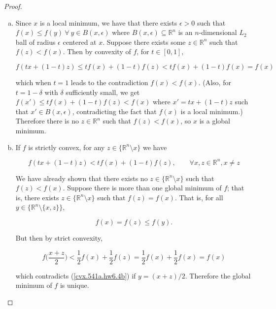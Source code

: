 \begin{proof}

\begin{enumerate}[(a)]

\item Since \(x\) is a local minimum, we have that there exists \(\epsilon > 0\) such that \(f(x) \leq f(y)  \ \forall \ y \in B(x, \epsilon)\) where \(B(x, \epsilon) \subseteq \mathbb{R}^n\) is an \(n\)-dimensional \(L_2\) ball of radius \(\epsilon\) centered at \(x\). Suppose there exists some \(z \in \mathbb{R}^n\) such that \(f(z) < f(x)\). Then by convexity of \(f\), for \(t \in [0, 1]\),

\[
f(tx + (1-t)z) \leq t f(x) + (1-t) f(z) <  t f(x) + (1-t) f(x) = f(x)
\]

which when \(t=1\) leads to the contradiction \(f(x) < f(x)\). (Also, for \(t = 1 -\delta\) with \(\delta\) sufficiently small, we get \(f(x') \leq t f(x) + (1-t) f(z) < f(x)\) where \(x' = tx + (1-t)z\) such that \(x' \in B(x, \epsilon)\), contradicting the fact that \(f(x)\) is a local minimum.) Therefore there is no \(z \in \mathbb{R}^n\) such that \(f(z) < f(x)\), so \(x\) is a global minimum.

\item If \(f\) is strictly convex, for any \(z \in \{ \mathbb{R}^n \setminus x\}\) we have

\begin{equation}\label{cvx.541a.hw6.4a}
f(tx + (1-t)z) < t f(x) + (1-t) f(z) , \qquad \forall x, z \in \mathbb{R}^n, x \neq z
\end{equation}

We have already shown that there exists no \(z \in \{\mathbb{R}^n \setminus x\}\) such that \(f(z) < f(x)\). Suppose there is more than one global minimum of \(f\); that is, there exists \(z \in \{ \mathbb{R}^n \setminus x\}\) such that \(f(z) = f(x)\). That is, for all \(y  \in\{ \mathbb{R}^n \setminus \{x, z \} \}\), 

\begin{equation}\label{cvx.541a.hw6.4b}
f(x) = f(z) \leq f(y).
\end{equation}

 But then by strict convexity,

\[
f \bigg( \frac{x+z}{2} \bigg) < \frac{1}{2} f(x) + \frac{1}{2} f(z) =  \frac{1}{2} f(x) + \frac{1}{2} f(x) = f(x)
\]

which contradicts (\ref{cvx.541a.hw6.4b}) if \(y = (x+z)/2\). Therefore the global minimum of \(f\) is unique.


\end{enumerate}
\end{proof}
